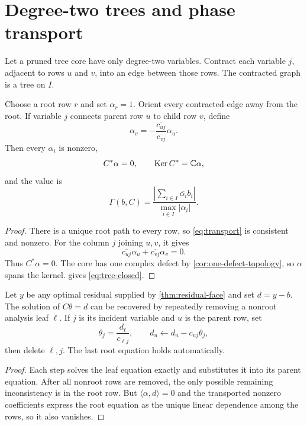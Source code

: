 \section{Degree-two trees and phase transport}
\label{sec:degree-two}

Let a pruned tree core have only degree-two variables.  Contract each
variable \(j\), adjacent to rows \(u\) and \(v\), into an edge between
those rows.  The contracted graph is a tree on \(I\).

\begin{theorem}\label{thm:transport}
Choose a root row \(r\) and set \(\alpha_r=1\).  Orient every contracted
edge away from the root.  If variable \(j\) connects parent row \(u\)
to child row \(v\), define
\begin{equation}\label{eq:transport}
 \alpha_v
 =
 -\frac{\overline{c_{uj}}}{\overline{c_{vj}}}\alpha_u.
\end{equation}
Then every \(\alpha_i\) is nonzero,
\[
 C^*\alpha=0,
 \qquad
 \operatorname{Ker} C^*=\mathbb C\alpha,
\]
and the value is
\begin{equation}\label{eq:tree-closed}
 \Gamma(b,C)
 =
 \frac{\left|\sum_{i\in I}\overline{\alpha_i}b_i\right|}
      {\max_{i\in I}|\alpha_i|}.
\end{equation}
\end{theorem}

\begin{proof}
There is a unique root path to every row, so \eqref{eq:transport} is
consistent and nonzero.  For the column \(j\) joining \(u,v\), it gives
\[
 \overline{c_{uj}}\alpha_u+
 \overline{c_{vj}}\alpha_v=0.
\]
Thus \(C^*\alpha=0\).  The core has one complex defect by
\cref{cor:one-defect-topology}, so \(\alpha\) spans the kernel.
 gives \eqref{eq:tree-closed}.
\end{proof}

\begin{proposition}\label{prop:recover}
Let \(y\) be any optimal residual supplied by
\cref{thm:residual-face} and set \(d=y-b\).  The solution of
\(C\theta=d\) can be recovered by repeatedly removing a nonroot
analysis leaf \(\ell\).  If \(j\) is its incident variable and \(u\) is
the parent row, set
\[
 \theta_j=\frac{d_\ell}{c_{\ell j}},
 \qquad
 d_u\leftarrow d_u-c_{uj}\theta_j,
\]
then delete \(\ell,j\).  The last root equation holds automatically.
\end{proposition}

\begin{proof}
Each step solves the leaf equation exactly and substitutes it into its
parent equation.  After all nonroot rows are removed, the only possible
remaining inconsistency is in the root row.  But
\(\langle\alpha,d\rangle=0\) and the transported nonzero coefficients
express the root equation as the unique linear dependence among the
rows, so it also vanishes.
\end{proof}

